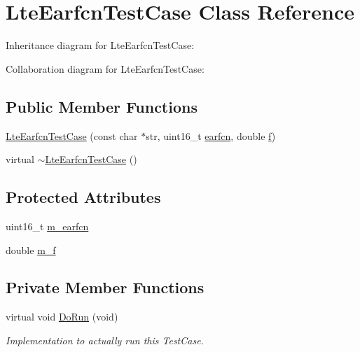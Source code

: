 \hypertarget{classLteEarfcnTestCase}{}\section{Lte\+Earfcn\+Test\+Case Class Reference}
\label{classLteEarfcnTestCase}


Inheritance diagram for Lte\+Earfcn\+Test\+Case\+:


Collaboration diagram for Lte\+Earfcn\+Test\+Case\+:
\subsection*{Public Member Functions}
\begin{DoxyCompactItemize}
\item 
\hyperlink{classLteEarfcnTestCase_ac8338e55759404b70bdb89bde0d357a7}{Lte\+Earfcn\+Test\+Case} (const char $\ast$str, uint16\+\_\+t \hyperlink{generate__test__data__lte__spectrum__value__txpsd_8m_a584be7562abb392609629331f8c6c42c}{earfcn}, double \hyperlink{80211b_8c_ae7ffc1a8f84fa47a0812b2f2b9627132}{f})
\item 
virtual \hyperlink{classLteEarfcnTestCase_a1f27b731608eb27b25d8081069510f1b}{$\sim$\+Lte\+Earfcn\+Test\+Case} ()
\end{DoxyCompactItemize}
\subsection*{Protected Attributes}
\begin{DoxyCompactItemize}
\item 
uint16\+\_\+t \hyperlink{classLteEarfcnTestCase_ab4fea55308ce0ef622597e722b19d005}{m\+\_\+earfcn}
\item 
double \hyperlink{classLteEarfcnTestCase_a98327c6792af6dd6d3eb5ed3772b0960}{m\+\_\+f}
\end{DoxyCompactItemize}
\subsection*{Private Member Functions}
\begin{DoxyCompactItemize}
\item 
virtual void \hyperlink{classLteEarfcnTestCase_a36386da997b4f57ab0fd57ae5c44d73f}{Do\+Run} (void)
\begin{DoxyCompactList}\small\item\em Implementation to actually run this Test\+Case. \end{DoxyCompactList}\end{DoxyCompactItemize}
